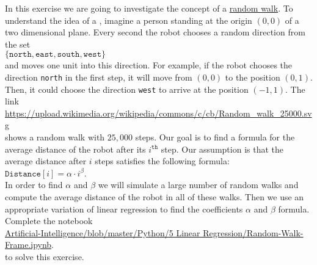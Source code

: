 \exercise
In this exercise we are going to investigate the concept of a
\href{https://en.wikipedia.org/wiki/Random_walk}{random walk}.
To understand the idea of a , imagine a person standing at the origin $(0,0)$ of a two
dimensional plane.  Every second the robot chooses a random direction from the set
\\[0.2cm]
\hspace*{1.3cm}
$\{ \texttt{north},  \texttt{east},  \texttt{south},  \texttt{west} \}$
\\[0.2cm]
and moves one unit into this direction.  For example, if the robot chooses the direction \texttt{north} in the
first step, it will move from $(0,0)$ to the position $(0,1)$.  Then, it could choose the direction
\texttt{west} to arrive at the position $(-1,1)$.  The link
\\[0.2cm]
\hspace*{1.3cm}
\href{https://upload.wikimedia.org/wikipedia/commons/c/cb/Random_walk_25000.svg}{https://upload.wikimedia.org/wikipedia/commons/c/cb/Random\_walk\_25000.svg}
\\[0.2cm]
shows a random walk with $25,000$ steps.  Our goal is to find a formula for the average distance of the robot
after its $i^\texttt{th}$ step.  Our assumption is that the average distance after $i$ steps satisfies the
following formula:
\\[0.2cm]
\hspace*{1.3cm}
$\mathtt{Distance}[i] = \alpha \cdot i^\beta$.
\\[0.2cm]
In order to find $\alpha$ and $\beta$ we will simulate a large number of random walks and compute
the average distance of the robot in all of these walks.  Then we use an appropriate variation of linear
regression to find the coefficients $\alpha$ and $\beta$ formula.  Complete the notebook
\\[0.2cm]
\hspace*{0.8cm}
\href{https://github.com/karlstroetmann/Artificial-Intelligence/blob/master/Python/5 Linear Regression/Random-Walk-Frame.ipynb}{
   Artificial-Intelligence/blob/master/Python/5 Linear Regression/Random-Walk-Frame.ipynb}.
\\[0.2cm]
to solve this exercise.
\eox

